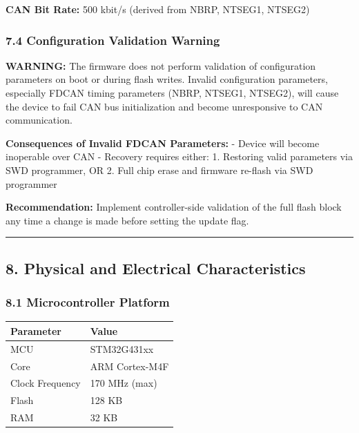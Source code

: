 \documentclass[
  11pt,
]{article}
\newcounter{none} %
\begin{document}
\textbf{CAN Bit Rate:} 500 kbit/s (derived from NBRP, NTSEG1, NTSEG2)

\subsubsection{7.4 Configuration Validation
Warning}\label{configuration-validation-warning}

\textbf{WARNING:} The firmware does not perform validation of
configuration parameters on boot or during flash writes. Invalid
configuration parameters, especially FDCAN timing parameters (NBRP,
NTSEG1, NTSEG2), will cause the device to fail CAN bus initialization
and become unresponsive to CAN communication.

\textbf{Consequences of Invalid FDCAN Parameters:} - Device will become
inoperable over CAN - Recovery requires either: 1. Restoring valid
parameters via SWD programmer, OR 2. Full chip erase and firmware
re-flash via SWD programmer

\textbf{Recommendation:} Implement controller-side validation of the
full flash block any time a change is made before setting the update
flag.

\begin{center}\rule{0.5\linewidth}{0.5pt}\end{center}

\subsection{8. Physical and Electrical
Characteristics}\label{physical-and-electrical-characteristics}

\subsubsection{8.1 Microcontroller
Platform}\label{microcontroller-platform}

{\def\LTcaptype{none} %
\begin{longtable}[]{@{}ll@{}}
\toprule\noalign{}
Parameter & Value \\
\midrule\noalign{}
\endhead
\bottomrule\noalign{}
\endlastfoot
MCU & STM32G431xx \\
Core & ARM Cortex-M4F \\
Clock Frequency & 170 MHz (max) \\
Flash & 128 KB \\
RAM & 32 KB \\
\end{longtable}
}
\end{document}
